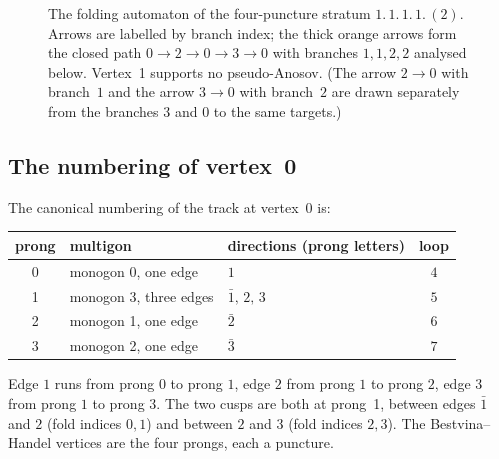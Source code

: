 \documentclass[12pt]{amsart}
\newcommand{\anti}[1]{\bar{#1}}          %
\theoremstyle{plain}
\theoremstyle{definition}
\begin{document}
\begin{figure}[t]
  \centering
  \caption{The folding automaton of the four-puncture stratum
    $1.\,1.\,1.\,1.\,(2)$.  Arrows are labelled by branch index; the
    thick orange arrows form the closed path $0\to2\to0\to3\to0$ with
    branches $1,1,2,2$ analysed below.  Vertex~1 supports no
    pseudo-Anosov.  (The arrow $2\to0$ with branch~$1$ and the arrow
    $3\to0$ with branch~$2$ are drawn separately from the branches $3$
    and $0$ to the same targets.)}
  \label{fig:automaton}
\end{figure}

\subsection{The numbering of vertex~0}
The canonical numbering of the track at vertex~0 is:
\begin{center}
  \small
  \begin{tabular}{@{}cllc@{}}
    \toprule
    prong & multigon & directions (prong letters) & loop \\
    \midrule
    0 & monogon 0, one edge    & $1$              & $4$ \\
    1 & monogon 3, three edges & $\anti1,\,2,\,3$ & $5$ \\
    2 & monogon 1, one edge    & $\anti2$         & $6$ \\
    3 & monogon 2, one edge    & $\anti3$         & $7$ \\
    \bottomrule
  \end{tabular}
\end{center}
Edge $1$ runs from prong $0$ to prong $1$, edge $2$ from prong $1$ to
prong $2$, edge $3$ from prong $1$ to prong $3$.  The two cusps are both
at prong~1, between edges $\anti1$ and $2$ (fold indices $0,1$) and
between $2$ and $3$ (fold indices $2,3$).  The Bestvina--Handel vertices
are the four prongs, each a puncture.
\end{document}
